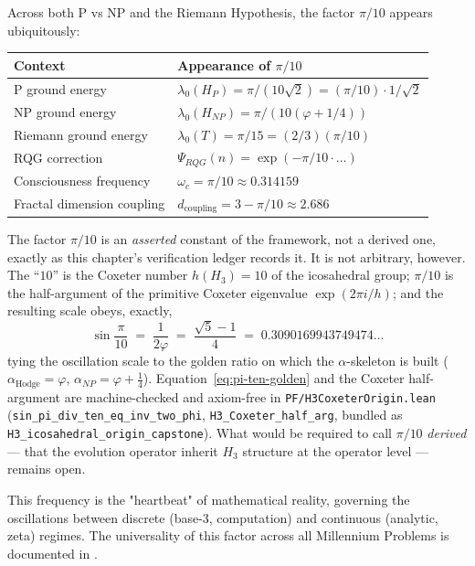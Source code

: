 Across both P vs NP and the Riemann Hypothesis, the factor $\pi/10$ appears ubiquitously:

\begin{center}
\begin{tabular}{ll}
\toprule
\textbf{Context} & \textbf{Appearance of $\pi/10$} \\
\midrule
P ground energy & $\lambda_0(H_P) = \pi/(10\sqrt{2}) = (\pi/10) \cdot 1/\sqrt{2}$ \\
NP ground energy & $\lambda_0(H_{NP}) = \pi/(10(\varphi + 1/4))$ \\
Riemann ground energy & $\lambda_0(T) = \pi/15 = (2/3)(\pi/10)$ \\
RQG correction & $\Psi_{RQG}(n) = \exp(-\pi/10 \cdot \ldots)$ \\
Consciousness frequency & $\omega_c = \pi/10 \approx 0.314159$ \\
Fractal dimension coupling & $d_{\text{coupling}} = 3 - \pi/10 \approx 2.686$ \\
\bottomrule
\end{tabular}
\end{center}

\begin{theorem}
\label{thm:universal_frequency}
The factor $\pi/10$ is an \emph{asserted} constant of the framework, not a derived
one, exactly as this chapter's verification ledger records it. It is not
arbitrary, however. The ``$10$'' is the Coxeter number $h(H_3) = 10$ of the
icosahedral group; $\pi/10$ is the half-argument of the primitive Coxeter
eigenvalue $\exp(2\pi i/h)$; and the resulting scale obeys, exactly,
\begin{equation}
\label{eq:pi-ten-golden}
\sin\frac{\pi}{10} \;=\; \frac{1}{2\varphi} \;=\; \frac{\sqrt{5}-1}{4}
\;=\; 0.3090169943749474\ldots
\end{equation}
tying the oscillation scale to the golden ratio on which the $\alpha$-skeleton is
built ($\alpha_{\text{Hodge}} = \varphi$, $\alpha_{NP} = \varphi + \tfrac14$).
Equation~\eqref{eq:pi-ten-golden} and the Coxeter half-argument are machine-checked
and axiom-free in \texttt{PF/H3CoxeterOrigin.lean}
(\texttt{sin\_pi\_div\_ten\_eq\_inv\_two\_phi}, \texttt{H3\_Coxeter\_half\_arg},
bundled as \texttt{H3\_icosahedral\_origin\_capstone}). What would be required to
call $\pi/10$ \emph{derived} --- that the evolution operator inherit $H_3$
structure at the operator level --- remains open.
\end{theorem}

This frequency is the "heartbeat" of mathematical reality, governing the oscillations between discrete (base-3, computation) and continuous (analytic, zeta) regimes. The universality of this factor across all Millennium Problems is documented in \cite{cohen2025spectralpi10}.


